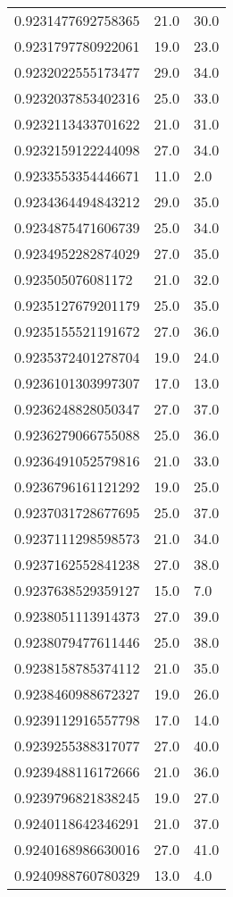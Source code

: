\begin{center}
\begin{supertabular}[H]{p{0.30\textwidth}p{0.05\textwidth}p{0.05\textwidth}}
0.9231477692758365 & 21.0 & 30.0 \\ 
0.9231797780922061 & 19.0 & 23.0 \\ 
0.9232022555173477 & 29.0 & 34.0 \\ 
0.9232037853402316 & 25.0 & 33.0 \\ 
0.9232113433701622 & 21.0 & 31.0 \\ 
0.9232159122244098 & 27.0 & 34.0 \\ 
0.9233553354446671 & 11.0 & 2.0 \\ 
0.9234364494843212 & 29.0 & 35.0 \\ 
0.9234875471606739 & 25.0 & 34.0 \\ 
0.9234952282874029 & 27.0 & 35.0 \\ 
0.923505076081172 & 21.0 & 32.0 \\ 
0.9235127679201179 & 25.0 & 35.0 \\ 
0.9235155521191672 & 27.0 & 36.0 \\ 
0.9235372401278704 & 19.0 & 24.0 \\ 
0.9236101303997307 & 17.0 & 13.0 \\ 
0.9236248828050347 & 27.0 & 37.0 \\ 
0.9236279066755088 & 25.0 & 36.0 \\ 
0.9236491052579816 & 21.0 & 33.0 \\ 
0.9236796161121292 & 19.0 & 25.0 \\ 
0.9237031728677695 & 25.0 & 37.0 \\ 
0.9237111298598573 & 21.0 & 34.0 \\ 
0.9237162552841238 & 27.0 & 38.0 \\ 
0.9237638529359127 & 15.0 & 7.0 \\ 
0.9238051113914373 & 27.0 & 39.0 \\ 
0.9238079477611446 & 25.0 & 38.0 \\ 
0.9238158785374112 & 21.0 & 35.0 \\ 
0.9238460988672327 & 19.0 & 26.0 \\ 
0.9239112916557798 & 17.0 & 14.0 \\ 
0.9239255388317077 & 27.0 & 40.0 \\ 
0.9239488116172666 & 21.0 & 36.0 \\ 
0.9239796821838245 & 19.0 & 27.0 \\ 
0.9240118642346291 & 21.0 & 37.0 \\ 
0.9240168986630016 & 27.0 & 41.0 \\ 
0.9240988760780329 & 13.0 & 4.0 \\ 

\end{supertabular}
\end{center}
